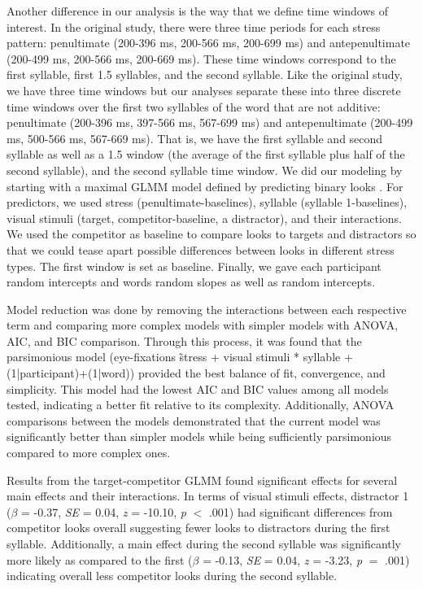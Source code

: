 Another difference in our analysis is the way that we define time windows of interest. In the original study, there were three time periods for each stress pattern: penultimate (200-396 ms, 200-566 ms, 200-699 ms) and antepenultimate (200-499 ms, 200-566 ms, 200-669 ms). These time windows correspond to the first syllable, first 1.5 syllables, and the second syllable. Like the original study, we have three time windows but our analyses separate these into three discrete time windows over the first two syllables of the word that are not additive: penultimate (200-396 ms, 397-566 ms, 567-699 ms) and antepenultimate (200-499 ms, 500-566 ms, 567-669 ms). That is, we have the first syllable and second syllable as well as a 1.5 window (the average of the first syllable plus half of the second syllable), and the second syllable time window. We did our modeling by starting with a maximal GLMM model defined by predicting binary looks \citep{Barr_2008}. For predictors, we used stress (penultimate-baselines), syllable (syllable 1-baselines), visual stimuli (target, competitor-baseline, a distractor), and their interactions. We used the competitor as baseline to compare looks to targets and distractors so that we could tease apart possible differences between looks in different stress types. The first window is set as baseline. Finally, we gave each participant random intercepts and words random slopes as well as random intercepts.

Model reduction was done by removing the interactions between each respective term and comparing more complex models with simpler models with ANOVA, AIC, and BIC comparison. Through this process, it was found that the parsimonious model (eye-fixations \~ stress + visual stimuli * syllable + (1|participant)+(1|word)) provided the best balance of fit, convergence, and simplicity. This model had the lowest AIC and BIC values among all models tested, indicating a better fit relative to its complexity. Additionally, ANOVA comparisons between the models demonstrated that the current model was significantly better than simpler models while being sufficiently parsimonious compared to more complex ones.

Results from the target-competitor GLMM found significant effects for several main effects and their interactions. In terms of visual stimuli effects, distractor 1 ($\beta$ = -0.37, \textit{SE} = 0.04, \textit{z} = -10.10, \textit{p} $<$ .001) had significant differences from competitor looks overall suggesting fewer looks to distractors during the first syllable. Additionally, a main effect during the second syllable was significantly more likely as compared to the first ($\beta$ = -0.13, \textit{SE} = 0.04, \textit{z} = -3.23, \textit{p} $=$ .001) indicating overall less competitor looks during the second syllable.

